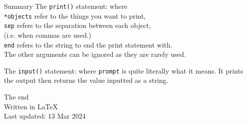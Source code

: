 \documentclass[dvipsnames, svgnames, x11names]{beamer}
\begin{document}
\begin{frame}[fragile]{Summary}
The \texttt{print()} statement:
where\\
\texttt{*objects} refer to the things you want to print,\\
\texttt{sep} refers to the separation between each object,\\
(i.e. when commas are used.)\\
\texttt{end} refers to the string to end the print statement with.\\
The other arguments can be ignored as they are rarely used.

\vspace{1em}

\noindent The \texttt{input()} statement:
where \texttt{prompt} is quite literally what it means. It prints the output then returns the value inputted as a string.
\end{frame}

\begin{frame}{\text{}}
	\begin{center}
		The end\\
		Written in \LaTeX\\
		Last updated: 13 Mar 2024
	\end{center}
\end{frame}
\end{document}
